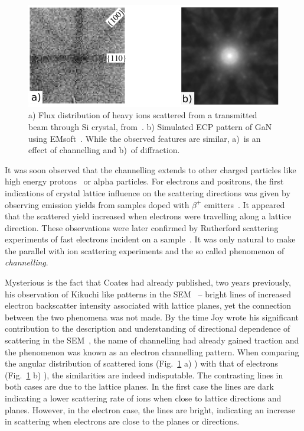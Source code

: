 \begin{figure}[ht]
    \centering
\includegraphics[width=0.66\linewidth]{Figures/icp-ecp.png}
\caption[Ion channelling.]{ a) Flux distribution of heavy ions scattered from a transmitted beam through \hkl[001] Si crystal, from~\cite{Assmann99}. b) Simulated ECP pattern of \hkl[001] GaN using EMsoft~\cite{EMsoft}. While the observed features are similar, a)~is an effect of channelling and b)~of diffraction.}
\label{Fig:icp}
\end{figure}





It was soon observed that the channelling extends to other charged particles like high energy protons~\cite{Dearnaley68} or alpha particles. For electrons and positrons, the first indications of crystal lattice influence on the scattering directions was given by observing emission yields from samples doped with $\beta^+$ emitters~\cite{Uggerhoj68}. It appeared that the scattered yield increased when electrons were travelling along a lattice direction. These observations were later confirmed by Rutherford scattering experiments of fast electrons incident on a sample~\cite{Uggerhoj69}. It was only natural to make the parallel with ion scattering experiments and the so called phenomenon of \textit{channelling}.  

Mysterious is the fact that Coates had already published, two years previously, his observation of Kikuchi like patterns in the SEM~\cite{Coates67} -- bright lines of increased electron backscatter intensity associated with lattice planes, yet the connection between the two phenomena was not made. By the time Joy wrote his significant contribution to the description and understanding of directional dependence of scattering in the SEM~\cite{Joy82}, the name of channelling had already gained traction and the phenomenon was known as an electron channelling pattern. When comparing the angular distribution of scattered ions (Fig.~\ref{Fig:icp} a) ) with that of electrons (Fig.~\ref{Fig:icp} b) ), the similarities are indeed indisputable. The contrasting lines in both cases are due to the lattice planes. In the first case the lines are dark indicating a lower scattering rate of ions when close to lattice directions and planes. However, in the electron case, the lines are bright, indicating an increase in scattering when electrons are close to the planes or directions. 

